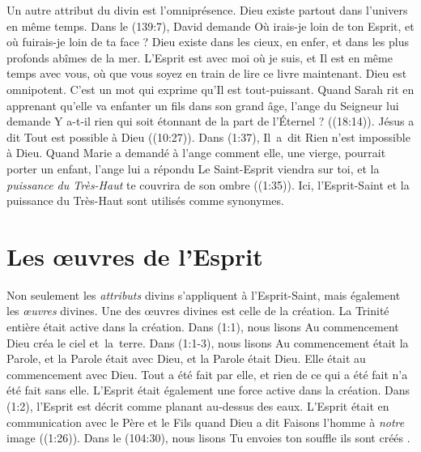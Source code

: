 Un autre attribut du divin est l'omniprésence. Dieu existe partout dans
 l'univers en même temps. Dans le (139:7), David demande\frcolon{}
 \Og Où irais-je loin de ton Esprit, et où fuirais-je loin de ta face ? \Fg{}
 Dieu existe dans les cieux, en enfer, et dans les plus profonds abîmes de
 la mer. L'Esprit est avec moi où je suis, et Il est en même temps avec vous,
 où que vous soyez en train de lire ce livre maintenant. Dieu est omnipotent.
 C'est un mot qui exprime qu'Il est tout-puissant. Quand Sarah rit en apprenant
 qu'elle va enfanter un fils dans son grand âge, l'ange du Seigneur lui demande\frcolon{}
 \Og Y a-t-il rien qui soit étonnant de la part de l'Éternel ? \Fg{}
 ((18:14)). Jésus a dit\frcolon{} \Og Tout est possible à Dieu \Fg{}
 ((10:27)). Dans (1:37), Il~a~dit\frcolon{}
 \Og Rien n'est impossible à Dieu. \Fg{} Quand Marie a demandé à l'ange comment
 elle, une vierge, pourrait porter un enfant, l'ange lui a répondu\frcolon{}
 \Og Le Saint-Esprit viendra sur toi, et la \emph{puissance du Très-Haut} te couvrira
 de son ombre \Fg{} ((1:35)). Ici, l'Esprit-Saint et
 la puissance du Très-Haut sont utilisés comme synonymes.

\section{Les \oe{}uvres de l'Esprit}


Non seulement les \emph{attributs} divins s'appliquent à l'Esprit-Saint, mais
 également les \emph{œuvres} divines.
 Une des œuvres divines est celle de la création.
 La Trinité entière était active dans la création.
 Dans (1:1), nous lisons\frcolon{}
 \Og Au commencement Dieu créa le ciel et~la~terre. \Fg{}
 Dans (1:1-3), nous lisons\frcolon{}
 \Og Au commencement était la Parole, et la Parole était avec Dieu,
 et la Parole était Dieu. Elle était au commencement avec Dieu.
 Tout a été fait par elle, et rien de ce qui a été fait n'a été fait
 sans elle. \Fg{}
 L'Esprit était également une force active dans la création.
 Dans (1:2), l'Esprit est décrit comme planant au-dessus
 des eaux. L'Esprit était en communication avec le Père et le Fils quand
 Dieu a dit\frcolon{} \Og Faisons l'homme à \emph{notre} image \Fg{} ((1:26)).
 Dans le (104:30), nous lisons\frcolon{}
 \Og Tu envoies ton souffle\frcolon{} ils sont créés
 . \Fg{}

